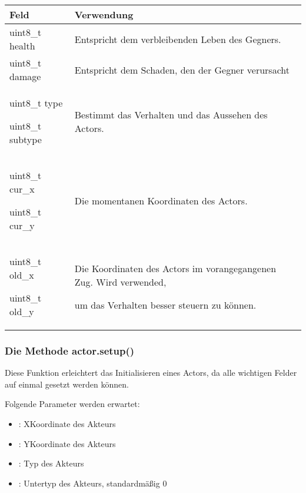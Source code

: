 \documentclass[letterpaper,10pt,ngerman]{sphinxmanual}
\begin{document}
\begin{savenotes}\sphinxattablestart
\centering
\begin{tabulary}{\linewidth}[t]{|T|T|}
\hline

Feld
&
Verwendung
\\
\hline
uint8\_t health
&
Entspricht
dem verbleibenden
Leben des Gegners.
\\
\hline
uint8\_t damage
&
Entspricht
dem Schaden, den der
Gegner verursacht
\\
\hline
uint8\_t type

uint8\_t subtype
&
Bestimmt das
Verhalten und das
Aussehen des Actors.
\\
\hline
uint8\_t cur\_x

uint8\_t cur\_y
&
Die momentanen
Koordinaten des
Actors.
\\
\hline
uint8\_t old\_x

uint8\_t old\_y
&
Die Koordinaten des
Actors im
vorangegangenen Zug.
Wird verwended,

um
das Verhalten besser
steuern zu können.
\\
\hline
\end{tabulary}
\par
\sphinxattableend\end{savenotes}


\subsubsection{Die Methode actor.setup()}
\label{\detokenize{programming:die-methode-actor-setup}}
Diese Funktion erleichtert das Initialisieren eines Actors, da alle wichtigen
Felder auf einmal gesetzt werden können.


Folgende Parameter werden erwartet:
\begin{itemize}
\item {} 
: X\sphinxhyphen{}Koordinate des Akteurs

\item {} 
: Y\sphinxhyphen{}Koordinate des Akteurs

\item {} 
: Typ des Akteurs

\item {} 
: Untertyp des Akteurs, standardmäßig 0

\end{itemize}
\end{document}

